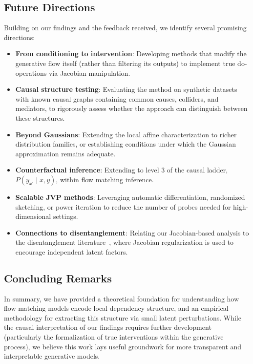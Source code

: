 \subsection{Future Directions}
Building on our findings and the feedback received, we identify several promising directions:

\begin{itemize}
  \itemsep0em
  \item \textbf{From conditioning to intervention}: Developing methods that modify the generative flow itself (rather than filtering its outputs) to implement true $\mathrm{do}$-operations via Jacobian manipulation.

  \item \textbf{Causal structure testing}: Evaluating the method on synthetic datasets with known causal graphs containing common causes, colliders, and mediators, to rigorously assess whether the approach can distinguish between these structures.

  \item \textbf{Beyond Gaussians}: Extending the local affine characterization to richer distribution families, or establishing conditions under which the Gaussian approximation remains adequate.

  \item \textbf{Counterfactual inference}: Extending to level 3 of the causal ladder, $P(y_{x'}\mid x,y)$, within flow matching inference.

  \item \textbf{Scalable JVP methods}: Leveraging automatic differentiation, randomized sketching, or power iteration to reduce the number of probes needed for high-dimensional settings.

  \item \textbf{Connections to disentanglement}: Relating our Jacobian-based analysis to the disentanglement literature~\cite{wei2021orthogonal, khrulkov2021disentangled}, where Jacobian regularization is used to encourage independent latent factors.
\end{itemize}

\subsection{Concluding Remarks}
In summary, we have provided a theoretical foundation for understanding how flow matching models encode local dependency structure, and an empirical methodology for extracting this structure via small latent perturbations. While the causal interpretation of our findings requires further development (particularly the formalization of true interventions within the generative process), we believe this work lays useful groundwork for more transparent and interpretable generative models.
